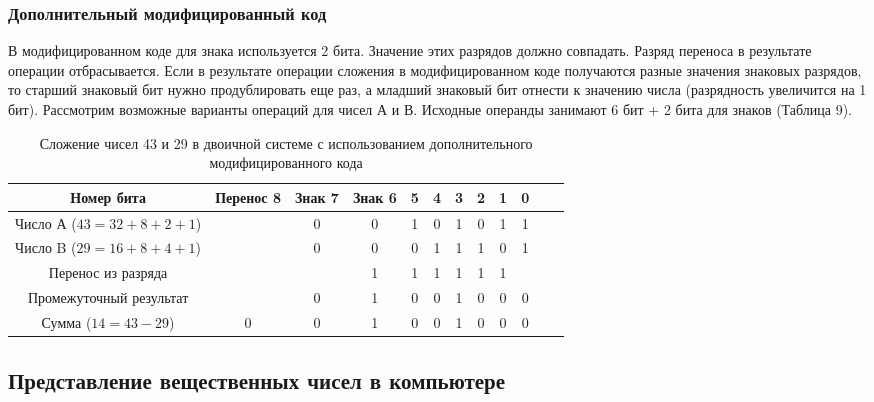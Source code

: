 \documentclass[a4paper]{article}
\begin{document}
\subsubsection{Дополнительный модифицированный код}

В модифицированном коде для знака используется 2 бита. Значение этих разрядов должно совпадать. Разряд переноса в результате операции отбрасывается. Если в результате операции сложения в модифицированном коде получаются разные значения знаковых разрядов, то старший знаковый бит нужно продублировать еще раз, а младший знаковый бит отнести к значению числа (разрядность увеличится на 1 бит). Рассмотрим возможные варианты операций для чисел А и В. Исходные операнды занимают 6 бит + 2 бита для знаков (Таблица 9).

\begin{table}\label{table:sub}
  \caption{Сложение чисел 43 и 29 в двоичной системе с использованием дополнительного модифицированного кода}
      \begin{center}
      \begin{tabular}{c * {11} {c}}
        \toprule
        Номер бита & Перенос 8 & \cellcolor{lightRed} Знак 7 & \cellcolor{lightRed}Знак 6 & 5 & 4 & 3 & 2 & 1 & 0 \\
        \toprule
        Число А ($43 = 32 + 8 + 2 + 1$) &  & \cellcolor{lightRed} 0 & \cellcolor{lightRed} 0 & 1 & 0 & 1 & 0 & 1 & 1\\
        \midrule
        Число B ($29 = 16 + 8 + 4 + 1$) &  & \cellcolor{lightRed} 0 & \cellcolor{lightRed} 0 & 0 & 1 & 1 & 1 & 0 & 1\\
        \midrule
        Перенос из разряда &  &  & 1 & 1 & 1 & 1 & 1 & 1 & \\
        \midrule
        Промежуточный результат &  &\cellcolor{lightRed} 0 & \cellcolor{lightRed}1 & 0 & 0 & 1 & 0 & 0 & 0\\
        \midrule
        Сумма ($14 = 43 - 29$) & \cellcolor{lightRed} 0 & \cellcolor{lightRed} 0 & 1 & 0 & 0 & 1 & 0 & 0 & 0 \\
        \midrule
      \end{tabular}
      \end{center}
    \end{table}


\subsection{Представление вещественных чисел в компьютере}
\end{document}

